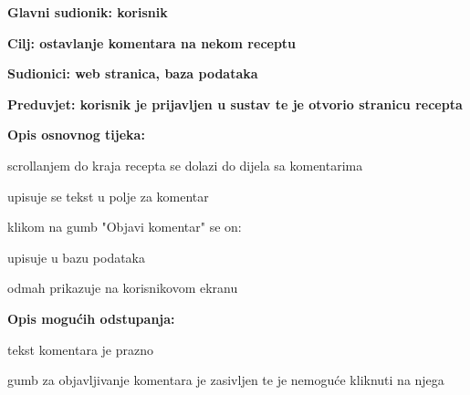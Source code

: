 					
					
					\noindent {}
					\begin{packed_item}
						\item \textbf{Glavni sudionik: korisnik}
						\item  \textbf{Cilj: ostavlanje komentara na nekom receptu}
						\item  \textbf{Sudionici: web stranica, baza podataka}
						\item  \textbf{Preduvjet: korisnik je prijavljen u sustav te je otvorio stranicu recepta}
						
						\item  \textbf{Opis osnovnog tijeka:}
						\item[] \begin{packed_enum}
							\item scrollanjem do kraja recepta se dolazi do dijela sa komentarima
							\item upisuje se tekst u polje za komentar
							\item klikom na gumb "Objavi komentar" se on:
							\begin{packed_enum}
								\item upisuje u bazu podataka
								\item odmah prikazuje na korisnikovom ekranu
							\end{packed_enum}
						\end{packed_enum}
						
						\item  \textbf{Opis mogućih odstupanja:}
						\item[] \begin{packed_item}
							\item[10.a] tekst komentara je prazno
							\begin{packed_enum}
								\item gumb za objavljivanje komentara je zasivljen te je nemoguće kliknuti na njega
							\end{packed_enum}
						\end{packed_item}
					\end{packed_item}
				
				
				
